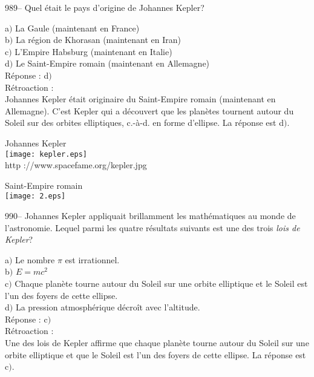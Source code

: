 ﻿\documentclass[letterpaper, 12pt]{article}
\begin{document}
989-- Quel \'etait le pays d'origine de Johannes Kepler?

a$)$ La Gaule (maintenant en France) \\
b$)$ La r\'egion de Khorasan (maintenant en Iran) \\
c$)$ L'Empire Habsburg (maintenant en Italie) \\
d$)$ Le Saint-Empire romain (maintenant en Allemagne)\\

R\'eponse : d$)$\\

R\'etroaction : \\
Johannes Kepler \'etait originaire du Saint-Empire romain
(maintenant en Allemagne). C'est Kepler qui a d\'ecouvert que les
plan\`etes tournent autour du Soleil sur des orbites elliptiques,
c.-\`a-d. en forme d'ellipse.
La r\'eponse est d$)$.\\

        \begin{center}
        Johannes Kepler\\
    \texttt{[image: kepler.eps]}\\
        {\footnotesize http ://www.spacefame.org/kepler.jpg}
    \end{center}

        \begin{center}
        Saint-Empire romain\\
    \texttt{[image: 2.eps]}\\
    \end{center}

990-- Johannes Kepler appliquait brillamment les math\'ematiques au
monde de l'astronomie. Lequel parmi les quatre r\'esultats suivants
est une des trois {\sl lois de Kepler}?

a$)$ Le nombre $\pi$ est irrationnel.\\
b$)$ $E=mc^2$ \\
c$)$ Chaque plan\`ete tourne autour du Soleil sur une orbite
elliptique et le Soleil
est l'un des foyers de cette ellipse. \\
d$)$ La pression atmosph\'erique d\'ecro\^it avec l'altitude.\\

R\'eponse : c$)$\\

R\'etroaction : \\
Une des lois de Kepler affirme que chaque plan\`ete tourne autour du
Soleil sur une orbite elliptique et que le Soleil
est l'un des foyers de cette ellipse. La r\'eponse est c$)$.\\
\end{document}
